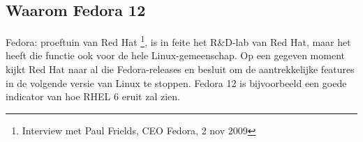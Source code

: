 \subsection{Waarom Fedora 12} 
Fedora: proeftuin van Red Hat \footnote{Interview met Paul Frields, CEO
Fedora, 2 nov 2009}, is in feite het R\&D-lab van Red Hat, maar het heeft die
functie ook voor de hele Linux-gemeenschap. Op een gegeven moment kijkt Red Hat naar al die Fedora-releases en besluit om de 
aantrekkelijke features in de volgende versie van Linux te stoppen. Fedora 12 is bijvoorbeeld een goede indicator van hoe RHEL 6 eruit zal zien. 
